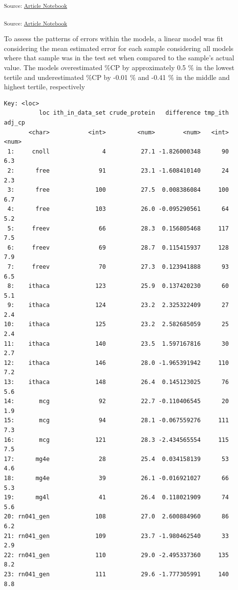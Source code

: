\documentclass[
]{agujournal2019}
\begin{document}
\textsubscript{Source:
\href{https://rvcrawford.github.io/glowing-system/index.qmd.html}{Article
Notebook}}

\hfill\break

\textsubscript{Source:
\href{https://rvcrawford.github.io/glowing-system/index.qmd.html}{Article
Notebook}}

To assess the patterns of errors within the models, a linear model was
fit considering the mean estimated error for each sample considering all
models where that sample was in the test set when compared to the
sample's actual value. The models overestimated \%CP by approximately
0.5 \% in the lowest tertile and underestimated \%CP by -0.01 \% and
-0.41 \% in the middle and highest tertile, respectively

\begin{verbatim}
Key: <loc>
          loc ith_in_data_set crude_protein   difference tmp_ith adj_cp
       <char>           <int>         <num>        <num>   <int>  <num>
 1:     cnoll               4          27.1 -1.826000348      90    6.3
 2:      free              91          23.1 -1.608410140      24    2.3
 3:      free             100          27.5  0.008386084     100    6.7
 4:      free             103          26.0 -0.095290561      64    5.2
 5:     freev              66          28.3  0.156805468     117    7.5
 6:     freev              69          28.7  0.115415937     128    7.9
 7:     freev              70          27.3  0.123941888      93    6.5
 8:    ithaca             123          25.9  0.137420230      60    5.1
 9:    ithaca             124          23.2  2.325322409      27    2.4
10:    ithaca             125          23.2  2.582685059      25    2.4
11:    ithaca             140          23.5  1.597167816      30    2.7
12:    ithaca             146          28.0 -1.965391942     110    7.2
13:    ithaca             148          26.4  0.145123025      76    5.6
14:       mcg              92          22.7 -0.110406545      20    1.9
15:       mcg              94          28.1 -0.067559276     111    7.3
16:       mcg             121          28.3 -2.434565554     115    7.5
17:      mg4e              28          25.4  0.034158139      53    4.6
18:      mg4e              39          26.1 -0.016921027      66    5.3
19:      mg4l              41          26.4  0.118021909      74    5.6
20: rn041_gen             108          27.0  2.600884960      86    6.2
21: rn041_gen             109          23.7 -1.980462540      33    2.9
22: rn041_gen             110          29.0 -2.495337360     135    8.2
23: rn041_gen             111          29.6 -1.777305991     140    8.8

\end{verbatim}
\end{document}
